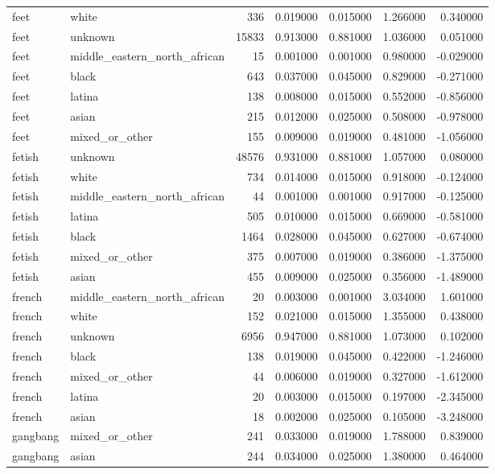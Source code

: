 \begin{tabular}{llrrrrr}
feet & white & 336 & 0.019000 & 0.015000 & 1.266000 & 0.340000 \\
feet & unknown & 15833 & 0.913000 & 0.881000 & 1.036000 & 0.051000 \\
feet & middle_eastern_north_african & 15 & 0.001000 & 0.001000 & 0.980000 & -0.029000 \\
feet & black & 643 & 0.037000 & 0.045000 & 0.829000 & -0.271000 \\
feet & latina & 138 & 0.008000 & 0.015000 & 0.552000 & -0.856000 \\
feet & asian & 215 & 0.012000 & 0.025000 & 0.508000 & -0.978000 \\
feet & mixed_or_other & 155 & 0.009000 & 0.019000 & 0.481000 & -1.056000 \\
fetish & unknown & 48576 & 0.931000 & 0.881000 & 1.057000 & 0.080000 \\
fetish & white & 734 & 0.014000 & 0.015000 & 0.918000 & -0.124000 \\
fetish & middle_eastern_north_african & 44 & 0.001000 & 0.001000 & 0.917000 & -0.125000 \\
fetish & latina & 505 & 0.010000 & 0.015000 & 0.669000 & -0.581000 \\
fetish & black & 1464 & 0.028000 & 0.045000 & 0.627000 & -0.674000 \\
fetish & mixed_or_other & 375 & 0.007000 & 0.019000 & 0.386000 & -1.375000 \\
fetish & asian & 455 & 0.009000 & 0.025000 & 0.356000 & -1.489000 \\
french & middle_eastern_north_african & 20 & 0.003000 & 0.001000 & 3.034000 & 1.601000 \\
french & white & 152 & 0.021000 & 0.015000 & 1.355000 & 0.438000 \\
french & unknown & 6956 & 0.947000 & 0.881000 & 1.073000 & 0.102000 \\
french & black & 138 & 0.019000 & 0.045000 & 0.422000 & -1.246000 \\
french & mixed_or_other & 44 & 0.006000 & 0.019000 & 0.327000 & -1.612000 \\
french & latina & 20 & 0.003000 & 0.015000 & 0.197000 & -2.345000 \\
french & asian & 18 & 0.002000 & 0.025000 & 0.105000 & -3.248000 \\
gangbang & mixed_or_other & 241 & 0.033000 & 0.019000 & 1.788000 & 0.839000 \\
gangbang & asian & 244 & 0.034000 & 0.025000 & 1.380000 & 0.464000 \\

\end{tabular}

